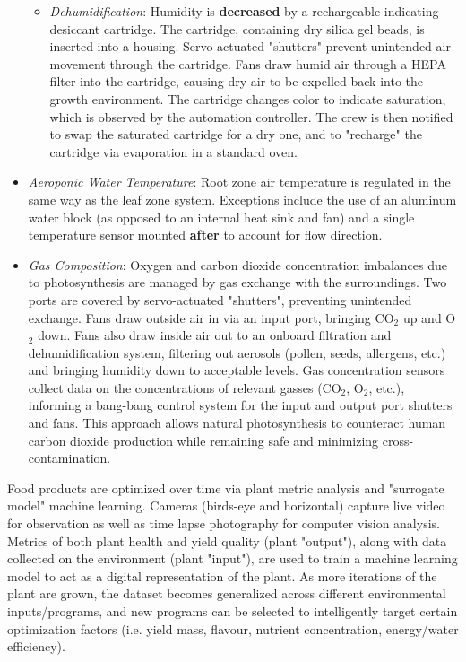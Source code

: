 \documentclass{report}
\begin{document}
\begin{itemize}
\begin{itemize}
        \item \textit{Dehumidification}: Humidity is \textbf{decreased} by a rechargeable indicating desiccant cartridge. The cartridge, containing dry silica gel beads, is inserted into a housing. Servo-actuated "shutters" prevent unintended air movement through the cartridge. Fans draw humid air through a HEPA filter into the cartridge, causing dry air to be expelled back into the growth environment. The cartridge changes color to indicate saturation, which is observed by the automation controller. The crew is then notified to swap the saturated cartridge for a dry one, and to "recharge" the cartridge via evaporation in a standard oven.
    \end{itemize}
    \item \textit{Aeroponic Water Temperature}: Root zone air temperature is regulated in the same way as the leaf zone system. Exceptions include the use of an aluminum water block (as opposed to an internal heat sink and fan) and a single temperature sensor mounted \textbf{after} to account for flow direction.
    \item \textit{Gas Composition}: Oxygen and carbon dioxide concentration imbalances due to photosynthesis are managed by gas exchange with the surroundings. Two ports are covered by servo-actuated "shutters", preventing unintended exchange. Fans draw outside air in via an input port, bringing CO${}_2$ up and O${}_2$ down. Fans also draw inside air out to an onboard filtration and dehumidification system, filtering out aerosols (pollen, seeds, allergens, etc.) and bringing humidity down to acceptable levels. Gas concentration sensors collect data on the concentrations of relevant gasses (CO${}_2$, O${}_2$, etc.), informing a bang-bang control system for the input and output port shutters and fans. This approach allows natural photosynthesis to counteract human carbon dioxide production while remaining safe and minimizing cross-contamination.
\end{itemize}

Food products are optimized over time via plant metric analysis and "surrogate model" machine learning. Cameras (birds-eye and horizontal) capture live video for observation as well as time lapse photography for computer vision analysis. Metrics of both plant health and yield quality (plant "output"), along with data collected on the environment (plant "input"), are used to train a machine learning model to act as a digital representation of the plant. As more iterations of the plant are grown, the dataset becomes generalized across different environmental inputs/programs, and new programs can be selected to intelligently target certain optimization factors (i.e. yield mass, flavour, nutrient concentration, energy/water efficiency).
\end{document}
